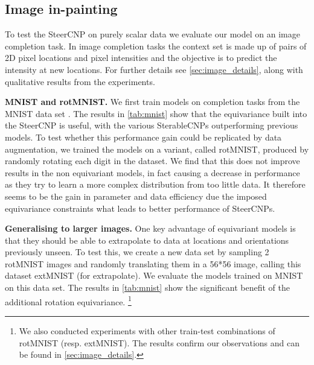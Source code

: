 \subsection{Image in-painting}
To test the SteerCNP on purely scalar data we evaluate our model on an image completion task.
In image completion tasks the context set is made up of pairs of 2D pixel locations and pixel intensities and the objective is to predict the intensity at new locations.
For further details see \cref{sec:image_details}, along with qualitative results from the experiments.

\textbf{MNIST and rotMNIST.}
We first train models on completion tasks from the MNIST data set \parencite{lecun2010mnist}.
The results in \cref{tab:mnist} show that the equivariance built into the SteerCNP is useful, with the various SterableCNPs outperforming previous models.
To test whether this performance gain could be replicated by data augmentation, we trained the models on a variant, called rotMNIST, produced by randomly rotating each digit in the dataset.
We find that this does not improve results in the non equivariant models, in fact causing a decrease in performance as they try to learn a more complex distribution from too little data.
It therefore seems to be the gain in parameter and data efficiency due the imposed equivariance constraints what leads to better performance of SteerCNPs.

\textbf{Generalising to larger images.}
One key advantage of equivariant models is that they should be able to extrapolate to data at locations and orientations previously unseen.
To test this, we create a new data set by sampling 2 rotMNIST images and randomly translating them in a 56*56 image, calling this dataset extMNIST (for extrapolate).
We evaluate the models trained on MNIST on this data set.
The results in \cref{tab:mnist} show the significant benefit of the additional rotation equivariance.
\footnote{We also conducted experiments with other train-test combinations of rotMNIST (resp. extMNIST).
	The results confirm our observations and can be found in \cref{sec:image_details}.
}

